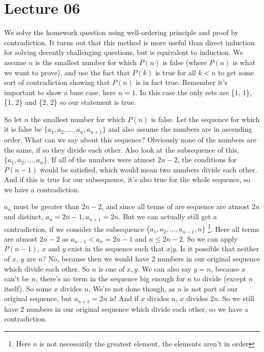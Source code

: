 \documentclass[a4paper,10pt]{article}
\theoremstyle{definition} %
\begin{document}
    \newpage
    \section{Lecture 06}

    We solve the homework question using well-ordering principle and proof by contradiction.
    It turns out that this method is more useful than direct induction for solving decently
    challenging questions, but is equivalent to induction. We assume $n$ is the smallest
    number for which $P(n)$ is false (where $P(n)$ is what we want to prove), 
    and use the fact that $P(k)$ is true for all $k < n$
    to get some sort of contradiction showing that $P(n)$ is in fact true. Remember it's
    important to show a base case, here $n = 1$. In this case the only sets are \{1, 1\}, 
    \{1, 2\} and \{2, 2\} so our statement is true.

    So let $n$ the smallest number for which $P(n)$ is false. Let the sequence for which 
    it is false be $\{a_{1}, a_{2}, \dots, a_{n}, a_{n+1}\}$ and also assume the numbers are
    in ascending order. What can we say about this sequence? Obviously none of the numbers
    are the same, if so they divide each other. Also look at the subsequence of this,
    $\{a_{1}, a_{2}, \dots, a_{n}\}$. If all of the numbers were atmost $2n-2$, the conditions
    for $P(n-1)$ would be satisfied, which would mean two numbers divide each other. And
    if this is true for our subsequence, it's also true for the whole sequence, so we have a contradiction.

    $a_{n}$ must be greater than $2n-2$, and since all terms of are sequence are atmost
    $2n$ and distinct, $a_{n} = 2n-1, a_{n+1} = 2n$. But we can actually still get a
    contradiction, if we consider the subsequence $\{a_{1}, a_{2}, \dots, a_{n-1}, n\}$
    \footnote{Here $n$ is not necessarily the greatest element, the elements aren't in 
    order}.
    Here all terms are atmost $2n-2$ as $a_{n-1} < a_{n} = 2n-1$ and $n \leq 2n-2$. So
    we can apply $P(n-1)$, $x$ and $y$ exist in the sequence such that $x | y$. Is it possible
    that neither of $x$, $y$ are $n$? No, because then we would have 2 numbers in our
    original sequence which divide each other. So $n$ is one of $x,y$. We can also say
    $y = n$, because $x$ can't be $n$, there's no term in the sequence big enough for $n$
    to divide (except $n$ itself). So some $x$ divides $n$. We're not done though, as $n$
    is not part of our original sequence, but $a_{n+1} = 2n$ is! And if $x$ divides $n$, 
    $x$ divides $2n$. So we still have 2 numbers in our original sequence which divide
    each other, so we have a contradiction.
\end{document}
